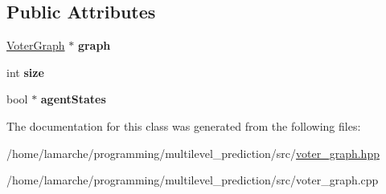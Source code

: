 \subsection*{Public Attributes}
\begin{DoxyCompactItemize}
\item 
\hypertarget{class_voter_state_a0e9830920101914d609c898c1222d919}{\hyperlink{class_voter_graph}{Voter\-Graph} $\ast$ {\bfseries graph}}\label{class_voter_state_a0e9830920101914d609c898c1222d919}

\item 
\hypertarget{class_voter_state_a1bfb4f3c9811324131c1a459f76dfa9d}{int {\bfseries size}}\label{class_voter_state_a1bfb4f3c9811324131c1a459f76dfa9d}

\item 
\hypertarget{class_voter_state_a9cd00dc55326b56744e49e8357f2890e}{bool $\ast$ {\bfseries agent\-States}}\label{class_voter_state_a9cd00dc55326b56744e49e8357f2890e}

\end{DoxyCompactItemize}


The documentation for this class was generated from the following files\-:\begin{DoxyCompactItemize}
\item 
/home/lamarche/programming/multilevel\-\_\-prediction/src/\hyperlink{voter__graph_8hpp}{voter\-\_\-graph.\-hpp}\item 
/home/lamarche/programming/multilevel\-\_\-prediction/src/voter\-\_\-graph.\-cpp\end{DoxyCompactItemize}
